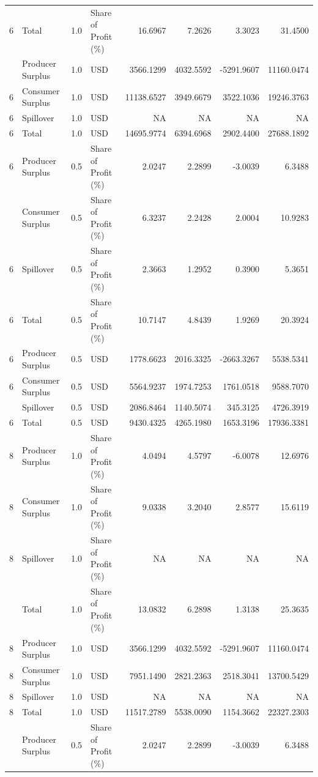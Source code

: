 \begin{table}
\begin{tabular}[t]{rlrlrrrr}
6 & Total & 1.0 & Share of Profit (\%) & 16.6967 & 7.2626 & 3.3023 & 31.4500\\
\addlinespace
6 & Producer Surplus & 1.0 & USD & 3566.1299 & 4032.5592 & -5291.9607 & 11160.0474\\
6 & Consumer Surplus & 1.0 & USD & 11138.6527 & 3949.6679 & 3522.1036 & 19246.3763\\
6 & Spillover & 1.0 & USD & NA & NA & NA & NA\\
6 & Total & 1.0 & USD & 14695.9774 & 6394.6968 & 2902.4400 & 27688.1892\\
6 & Producer Surplus & 0.5 & Share of Profit (\%) & 2.0247 & 2.2899 & -3.0039 & 6.3488\\
\addlinespace
6 & Consumer Surplus & 0.5 & Share of Profit (\%) & 6.3237 & 2.2428 & 2.0004 & 10.9283\\
6 & Spillover & 0.5 & Share of Profit (\%) & 2.3663 & 1.2952 & 0.3900 & 5.3651\\
6 & Total & 0.5 & Share of Profit (\%) & 10.7147 & 4.8439 & 1.9269 & 20.3924\\
6 & Producer Surplus & 0.5 & USD & 1778.6623 & 2016.3325 & -2663.3267 & 5538.5341\\
6 & Consumer Surplus & 0.5 & USD & 5564.9237 & 1974.7253 & 1761.0518 & 9588.7070\\
\addlinespace
6 & Spillover & 0.5 & USD & 2086.8464 & 1140.5074 & 345.3125 & 4726.3919\\
6 & Total & 0.5 & USD & 9430.4325 & 4265.1980 & 1653.3196 & 17936.3381\\
8 & Producer Surplus & 1.0 & Share of Profit (\%) & 4.0494 & 4.5797 & -6.0078 & 12.6976\\
8 & Consumer Surplus & 1.0 & Share of Profit (\%) & 9.0338 & 3.2040 & 2.8577 & 15.6119\\
8 & Spillover & 1.0 & Share of Profit (\%) & NA & NA & NA & NA\\
\addlinespace
8 & Total & 1.0 & Share of Profit (\%) & 13.0832 & 6.2898 & 1.3138 & 25.3635\\
8 & Producer Surplus & 1.0 & USD & 3566.1299 & 4032.5592 & -5291.9607 & 11160.0474\\
8 & Consumer Surplus & 1.0 & USD & 7951.1490 & 2821.2363 & 2518.3041 & 13700.5429\\
8 & Spillover & 1.0 & USD & NA & NA & NA & NA\\
8 & Total & 1.0 & USD & 11517.2789 & 5538.0090 & 1154.3662 & 22327.2303\\
\addlinespace
8 & Producer Surplus & 0.5 & Share of Profit (\%) & 2.0247 & 2.2899 & -3.0039 & 6.3488\\

\end{tabular}
\end{table}
